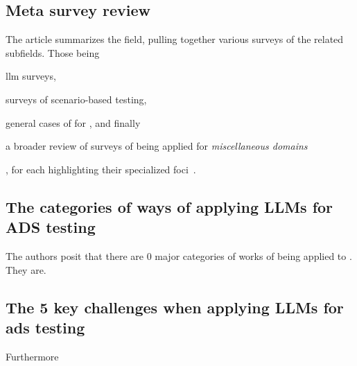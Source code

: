 \subsection{Meta survey review}

The article summarizes the field, pulling together various surveys of the
related subfields. Those being \begin{inparaenum}
    \item \acrshort{llm} surveys,
    \item surveys of scenario-based testing,
    \item general cases of  for , and finally
    \item a broader review of surveys of  being applied for
    \textit{miscellaneous domains}
\end{inparaenum},
for each highlighting their specialized
foci~\cite[2]{surveyLLMScenarioBasedTesting}.

\subsection{The categories of ways of applying LLMs for ADS testing}

The authors posit that there are \num{0} major categories of works of
 being applied to . They are.

\subsection{The \num{5} key challenges when applying LLMs for
    \acrshort{ads} testing}

Furthermore
